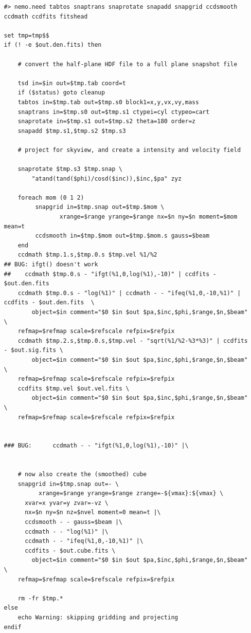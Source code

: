 \documentclass[10pt,dvips]{article}
\begin{document}
{\begin{verbatim}
#> nemo.need tabtos snaptrans snaprotate snapadd snapgrid ccdsmooth ccdmath ccdfits fitshead

set tmp=tmp$$
if (! -e $out.den.fits) then

    # convert the half-plane HDF file to a full plane snapshot file

    tsd in=$in out=$tmp.tab coord=t
    if ($status) goto cleanup
    tabtos in=$tmp.tab out=$tmp.s0 block1=x,y,vx,vy,mass
    snaptrans in=$tmp.s0 out=$tmp.s1 ctypei=cyl ctypeo=cart
    snaprotate in=$tmp.s1 out=$tmp.s2 theta=180 order=z
    snapadd $tmp.s1,$tmp.s2 $tmp.s3

    # project for skyview, and create a intensity and velocity field

    snaprotate $tmp.s3 $tmp.snap \
        "atand(tand($phi)/cosd($inc)),$inc,$pa" zyz

    foreach mom (0 1 2)
         snapgrid in=$tmp.snap out=$tmp.$mom \
                xrange=$range yrange=$range nx=$n ny=$n moment=$mom mean=t
         ccdsmooth in=$tmp.$mom out=$tmp.$mom.s gauss=$beam
    end
    ccdmath $tmp.1.s,$tmp.0.s $tmp.vel %1/%2
## BUG: ifgt() doesn't work
##    ccdmath $tmp.0.s - "ifgt(%1,0,log(%1),-10)" | ccdfits - $out.den.fits
    ccdmath $tmp.0.s - "log(%1)" | ccdmath - - "ifeq(%1,0,-10,%1)" | ccdfits - $out.den.fits  \
        object=$in comment="$0 $in $out $pa,$inc,$phi,$range,$n,$beam"  \
	refmap=$refmap scale=$refscale refpix=$refpix
    ccdmath $tmp.2.s,$tmp.0.s,$tmp.vel - "sqrt(%1/%2-%3*%3)" | ccdfits - $out.sig.fits \
        object=$in comment="$0 $in $out $pa,$inc,$phi,$range,$n,$beam" 	\
	refmap=$refmap scale=$refscale refpix=$refpix
    ccdfits $tmp.vel $out.vel.fits \
        object=$in comment="$0 $in $out $pa,$inc,$phi,$range,$n,$beam" 	\
	refmap=$refmap scale=$refscale refpix=$refpix


### BUG:      ccdmath - - "ifgt(%1,0,log(%1),-10)" |\


    # now also create the (smoothed) cube
    snapgrid in=$tmp.snap out=- \
          xrange=$range yrange=$range zrange=-${vmax}:${vmax} \
	  xvar=x yvar=y zvar=-vz \
	  nx=$n ny=$n nz=$nvel moment=0 mean=t |\
      ccdsmooth - - gauss=$beam |\
      ccdmath - - "log(%1)" |\
      ccdmath - - "ifeq(%1,0,-10,%1)" |\
      ccdfits - $out.cube.fits \
        object=$in comment="$0 $in $out $pa,$inc,$phi,$range,$n,$beam" \
	refmap=$refmap scale=$refscale refpix=$refpix

    rm -fr $tmp.*
else
    echo Warning: skipping gridding and projecting
endif


\end{verbatim}}
\end{document}
